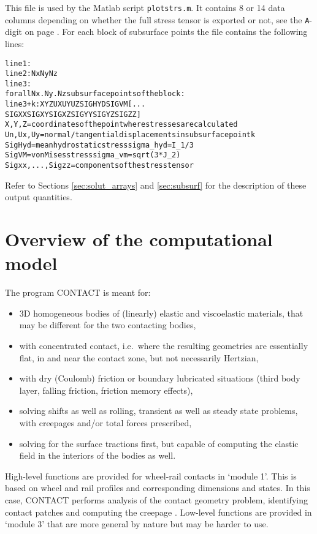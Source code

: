 \documentclass[12pt]{report}
\begin{document}
This file is used by the Matlab script {\tt plotstrs.m}. It contains 8
or 14 data columns depending on whether the full stress tensor is
exported or not, see the {\tt A}-digit on page \pageref{a-digit}. For each
block of subsurface points the file contains the following lines:
\begin{alltt}\small
  line 1: % comment line, describing variables on second line
  line 2:   Nx  Ny  Nz
  line 3: % comment line, describing columns of the table
  for all Nx.Ny.Nz subsurface points of the block:
     line 3+k:  X   Y   Z   UX   UY   UZ   SIGHYD  SIGVM [ ...
                                 SIGXX  SIGXY  SIGXZ  SIGYY SIGYZ  SIGZZ ]
  X,Y,Z    = coordinates of the point where stresses are calculated
  Un,Ux,Uy = normal/tangential displacements in subsurface point k
  SigHyd   = mean hydrostatic stress sigma_hyd = I_1/3
  SigVM    = von Mises stress sigma_vm = sqrt(3*J_2)
  Sigxx,...,Sigzz = components of the stress tensor
\end{alltt}
Refer to Sections \ref{sec:solut_arrays} and \ref{sec:subsurf} for the
description of these output quantities.


\chapter{Overview of the computational model}
\label{chp:comput_model}

The program CONTACT is meant for:
\begin{itemize}
\item 3D homogeneous bodies of (linearly) elastic and viscoelastic
        materials, that may be different for the two contacting bodies,
\item with concentrated contact, i.e.\ where the resulting geometries are
        essentially flat, in and near the contact zone, but not necessarily
        Hertzian,
\item with dry (Coulomb) friction or boundary lubricated situations
        (third body layer, falling friction, friction memory effects),
\item solving shifts as well as rolling, transient as well as steady state
        problems, with creepages and/or total forces prescribed,
\item solving for the surface tractions first, but capable of computing the
        elastic field in the interiors of the bodies as well.
\end{itemize}
High-level functions are provided for wheel-rail contacts in `module 1'.
This is based on wheel and rail profiles and corresponding dimensions and
states. In this case, CONTACT performs analysis of the contact geometry
problem, identifying contact patches and computing the creepage
\cite{Vollebregt2020b-wrgeom,Vollebregt2020c-distr-force}. Low-level
functions are provided in `module 3' that are more general by nature but
may be harder to use.
\end{document}
